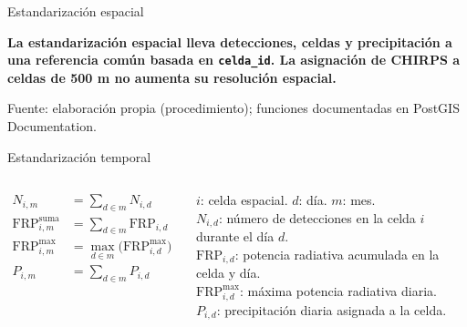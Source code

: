 \documentclass[aspectratio=169,11pt]{beamer}
\newcommand{\fuente}[1]{{\vfill\tiny\color{GrisTexto!70!black} Fuente: #1}}
\begin{document}
\begin{frame}{Estandarizaci\'on espacial}
  \vspace{0.18cm}
  {\footnotesize\color{VerdeOscuro}\textbf{La estandarizaci\'on espacial lleva detecciones, celdas y precipitaci\'on a una referencia com\'un basada en \texttt{celda\_id}. La asignaci\'on de CHIRPS a celdas de 500 m no aumenta su resoluci\'on espacial.}\par}
  \fuente{elaboraci\'on propia (procedimiento); funciones documentadas en PostGIS Documentation.}
\end{frame}

\begin{frame}{Estandarizaci\'on temporal}
  \begin{columns}[T]
      \tiny
      \begin{align*}
        N_{i,m} &= \sum_{d \in m} N_{i,d} \\[-7pt]
        \mathrm{FRP}^{\mathrm{suma}}_{i,m} &= \sum_{d \in m} \mathrm{FRP}_{i,d} \\[-7pt]
        \mathrm{FRP}^{\max}_{i,m} &= \max_{d \in m}\bigl(\mathrm{FRP}^{\max}_{i,d}\bigr) \\[-7pt]
        P_{i,m} &= \sum_{d \in m} P_{i,d}
      \end{align*}
      \vspace{0.04cm}
      {\tiny $i$: celda espacial. \quad $d$: d\'ia. \quad $m$: mes.\\[1pt]
      $N_{i,d}$: n\'umero de detecciones en la celda $i$ durante el d\'ia $d$.\\[1pt]
      $\mathrm{FRP}_{i,d}$: potencia radiativa acumulada en la celda y d\'ia.\\[1pt]
      $\mathrm{FRP}^{\max}_{i,d}$: m\'axima potencia radiativa diaria.\\[1pt]
      $P_{i,d}$: precipitaci\'on diaria asignada a la celda.\par}
  \end{columns}

  \vspace{0.08cm}
  \centering
\end{frame}
\end{document}
